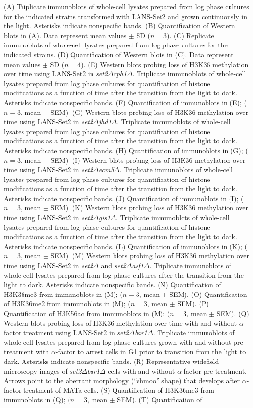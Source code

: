 \documentclass[11pt]{biorxiv}
\newcommand{\setdelt}{\emph{set2$\Delta$}\xspace}
\newcommand{\setdeltbardelt}{\emph{set2$\Delta$bar1$\Delta$}\xspace}
\newcommand{\setdeltasfdelt}{\emph{set2$\Delta$asf1$\Delta$}\xspace}
\newcommand{\setdeltrphdelt}{\emph{set2$\Delta$rph1$\Delta$}\xspace}
\newcommand{\setdeltgisdelt}{\emph{set2$\Delta$gis1$\Delta$}\xspace}
\newcommand{\setdeltjhddelt}{\emph{set2$\Delta$jhd1$\Delta$}\xspace}
\newcommand{\setdeltecmdelt}{\emph{set2$\Delta$ecm5$\Delta$}\xspace}
\begin{document}
\noindent (A) Triplicate immunoblots of whole-cell lysates prepared from log phase cultures for the indicated strains transformed with LANS-Set2 and grown continuously in the light. Asterisks indicate nonspecific bands. (B) Quantification of Western blots in (A). Data represent mean values $\pm$ SD ($n = 3$). (C) Replicate immunoblots of whole-cell lysates prepared from log phase cultures for the indicated strains. (D) Quantification of Western blots in (C). Data represent mean values $\pm$ SD ($n = 4$). (E) Western blots probing loss of H3K36 methylation over time using LANS-Set2 in \setdeltrphdelt. Triplicate immunoblots of whole-cell lysates prepared from log phase cultures for quantification of histone modifications as a function of time after the transition from the light to dark. Asterisks indicate nonspecific bands. (F) Quantification of immunoblots in (E); ($n = 3$, mean $\pm$ SEM). (G) Western blots probing loss of H3K36 methylation over time using LANS-Set2 in \setdeltjhddelt. Triplicate immunoblots of whole-cell lysates prepared from log phase cultures for quantification of histone modifications as a function of time after the transition from the light to dark. Asterisks indicate nonspecific bands. (H) Quantification of immunoblots in (G); ($n = 3$, mean $\pm$ SEM). (I) Western blots probing loss of H3K36 methylation over time using LANS-Set2 in \setdeltecmdelt. Triplicate immunoblots of whole-cell lysates prepared from log phase cultures for quantification of histone modifications as a function of time after the transition from the light to dark. Asterisks indicate nonspecific bands. (J) Quantification of immunoblots in (I); ($n = 3$, mean $\pm$ SEM). (K) Western blots probing loss of H3K36 methylation over time using LANS-Set2 in \setdeltgisdelt. Triplicate immunoblots of whole-cell lysates prepared from log phase cultures for quantification of histone modifications as a function of time after the transition from the light to dark. Asterisks indicate nonspecific bands. (L) Quantification of immunoblots in (K); ($n = 3$, mean $\pm$ SEM). (M) Western blots probing loss of H3K36 methylation over time using LANS-Set2 in \setdelt and \setdeltasfdelt. Triplicate immunoblots of whole-cell lysates prepared from log phase cultures after the transition from the light to dark. Asterisks indicate nonspecific bands. (N) Quantification of H3K36me3 from immunoblots in (M); ($n = 3$, mean $\pm$ SEM). (O) Quantification of H3K36me2 from immunoblots in (M); ($n = 3$, mean $\pm$ SEM). (P) Quantification of H3K56ac from immunoblots in (M); ($n = 3$, mean $\pm$ SEM). (Q) Western blots probing loss of H3K36 methylation over time with and without $\alpha$-factor treatment using LANS-Set2 in \setdeltbardelt. Triplicate immunoblots of whole-cell lysates prepared from log phase cultures grown with and without pre-treatment with $\alpha$-factor to arrest cells in G1 prior to transition from the light to dark. Asterisks indicate nonspecific bands. (R) Representative widefield microscopy images of \setdeltbardelt cells with and without $\alpha$-factor pre-treatment. Arrows point to the aberrant morphology (``shmoo'' shape) that develops after $\alpha$-factor treatment of MATa cells. (S) Quantification of H3K36me3 from immunoblots in (Q); ($n = 3$, mean $\pm$ SEM). (T) Quantification of 
\end{document}
